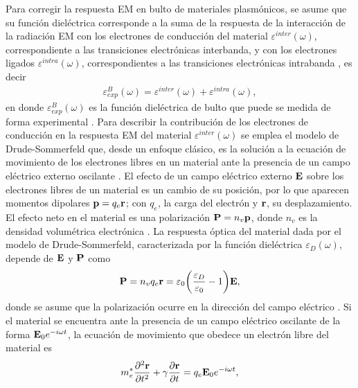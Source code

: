 Para corregir la respuesta EM  en bulto de materiales plasmónicos, se asume que su función dieléctrica corresponde a la suma de la respuesta de la interacción de la radiación EM con los electrones de conducción del material  $\varepsilon^{inter}(\omega) $, correspondiente a las transiciones electrónicas interbanda, y con los electrones ligados  $\varepsilon^{intra}(\omega) $, correspondientes a las transiciones electrónicas intrabanda \cite{noguez2007surface}, es decir
	\begin{align*}
	\varepsilon^B_{exp}(\omega) = \varepsilon^{inter}(\omega) + \varepsilon^{intra}(\omega),
	\end{align*}
en donde $\varepsilon^B_{exp}(\omega)$ es la función dieléctrica de bulto que puede se medida de forma experimental \cite{johnson1972constants}. Para describir la contribución de los electrones de conducción en la respuesta EM del material $\varepsilon^{inter}(\omega)$ se emplea el modelo de Drude-Sommerfeld que, desde un enfoque clásico, es la solución a la ecuación de movimiento de los electrones libres en un material ante la presencia de un campo eléctrico externo oscilante \cite{gross2014festkorperphysik}. El efecto de un campo eléctrico externo $\vb{E}$ sobre los electrones libres de un material es un cambio de su posición, por lo que aparecen momentos dipolares $\vb{p}=q_e\vb{r}$; con $q_e$, la carga del electrón y $\vb{r}$, su desplazamiento.  El efecto neto en el material es una polarización $\vb{P} = n_v \vb{p}$, donde $n_v$ es la densidad volumétrica electrónica \cite{novotny2006principles}.  La respuesta óptica del material dada por el modelo de Drude-Sommerfeld, caracterizada por la función dieléctrica $\varepsilon_D(\omega)$, depende de $\vb{E}$ y $\vb{P}$ como 
	\begin{align}
	\vb{P} = n_v q_e \vb{r} =\varepsilon_0\qty(\frac{\varepsilon_D}{\varepsilon_0}-1)\vb{E},
	\label{eq:PolarizationDrude}
	\end{align}
donde se asume que la polarización ocurre en la dirección del campo eléctrico \cite{novotny2006principles}. Si el material se encuentra ante la presencia de un campo eléctrico oscilante de la forma $\vb{E}_0 e^{-i\omega t}$, la ecuación de movimiento que obedece un electrón libre del material es \cite{kreibig1995clusters,gross2014festkorperphysik}
	\begin{align}
	m_e^* \pdv[2]{\vb{r}}{t} +  \gamma \pdv{\vb{r}}{t} = q_e\vb{E}_0e^{-i\omega t},
	\label{eq:movementDrude}
	\end{align}
